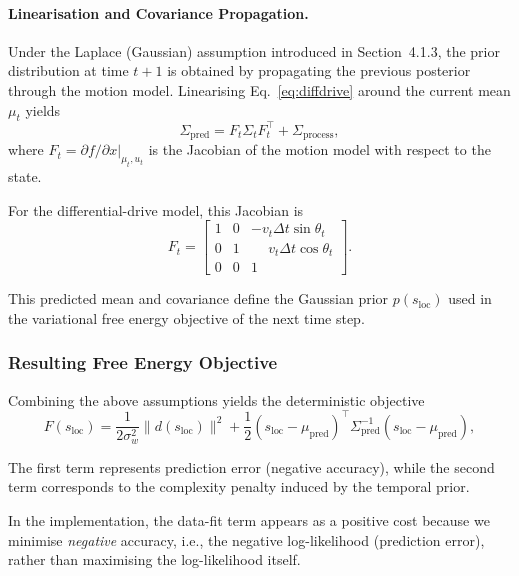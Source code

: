 \documentclass[a4paper, twoside]{article}
\begin{document}
\paragraph{Linearisation and Covariance Propagation.}
Under the Laplace (Gaussian) assumption introduced in Section~4.1.3, the prior
distribution at time $t+1$ is obtained by propagating the previous posterior
through the motion model. Linearising Eq.~\eqref{eq:diffdrive} around the current
mean $\mu_t$ yields
\begin{equation}
\Sigma_{\text{pred}}
=
F_t \Sigma_t F_t^\top + \Sigma_{\text{process}},
\label{eq:ekf-prediction}
\end{equation}
where $F_t = \partial f / \partial x \rvert_{\mu_t,u_t}$ is the Jacobian of the
motion model with respect to the state.

For the differential-drive model, this Jacobian is
\begin{equation}
F_t =
\begin{bmatrix}
1 & 0 & -v_t \Delta t \sin \theta_t \\
0 & 1 & \phantom{-}v_t \Delta t \cos \theta_t \\
0 & 0 & 1
\end{bmatrix}.
\end{equation}

This predicted mean and covariance define the Gaussian prior
$p(s_{\text{loc}})$ used in the variational free energy objective of the next
time step.


\subsubsection{Resulting Free Energy Objective}
\label{sec:room-objective}

Combining the above assumptions yields the deterministic objective
\begin{equation}
    F(s_{\text{loc}})
    =
    \frac{1}{2\sigma_w^2}\|d(s_{\text{loc}})\|^2
    +
    \frac{1}{2}
    (s_{\text{loc}}-\mu_{\text{pred}})^\top
    \Sigma_{\text{pred}}^{-1}
    (s_{\text{loc}}-\mu_{\text{pred}}),
\end{equation}

The first term represents prediction error (negative accuracy), while the second
term corresponds to the complexity penalty induced by the temporal prior.

In the implementation, the data-fit term appears as a positive cost because we minimise
\emph{negative} accuracy, i.e., the negative log-likelihood (prediction error), rather than
maximising the log-likelihood itself.
\end{document}
